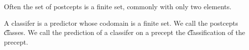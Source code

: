 

Often the set of postcepts is a finite set, commonly with only two elements.


A classifer is a predictor whose codomain is a finite set.
We call the postcepts \t{classes}.
We call the prediction of a classifer on a precept the \t{classification} of the precept.
